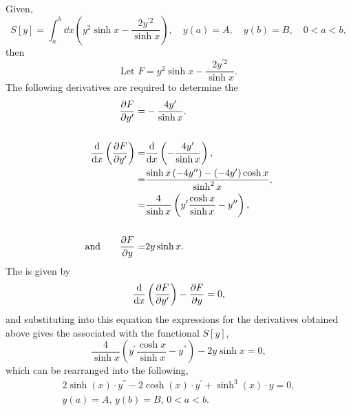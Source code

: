 Given,
\[
	S[y] = \int_a^b \dd x\left(y^2\sinh x -\frac{2y^{\prime 2}}{\sinh x}\right),\quad y(a) = A,\quad y(b) = B,\quad 0< a < b,
\]
then
\[
	\textrm{Let } F = y^2\sinh x -\frac{2y^{\prime 2}}{\sinh x}.
\]
The following derivatives are required to determine the \el{}
\begin{equation*}
\begin{split}
	\frac{\partial F}{\partial y^\prime} =& -\frac{4y^\prime}{\sinh x}.\\\\
	\frac{\mathrm{d}}{\mathrm{d}x}\left(\frac{\partial F}{\partial y^\prime}\right) =& \frac{\mathrm{d}}{\mathrm{d}x}\left( -\frac{4y^\prime}{\sinh x}\right),\\
	=& \frac{\sinh x\left(-4y^{\prime\prime}\right)-\left(-4y^\prime\right)\cosh x }{\sinh^2x},\\
	=& \frac{4}{\sinh x}\left(y^\prime\frac{\cosh x}{\sinh x}-y^{\prime\prime}\right),\\\\
	\textrm{and}\quad\quad{} \frac{\partial F}{\partial y}=& 2y\sinh x.
\end{split}
\end{equation*}
The \el is given by
\[
	\frac{\mathrm{d}}{\mathrm{d}x}\left(\frac{\partial F}{\partial y^\prime}\right)-\frac{\partial F}{\partial y} = 0,
\]
and substituting into this equation the expressions for the derivatives obtained above gives the \el associated with the functional $S[y]$,
\[
	\frac{4}{\sinh x}\left(y^\prime\frac{\cosh x}{\sinh x}-y^\dprime\right) - 2y\sinh x = 0,
\]
which can be rearranged into the following,
\begin{gather}
	2\sinh(x)\cdot y^\dprime - 2\cosh(x)\cdot y^\prime + \sinh^3(x)\cdot y = 0, \\ 
	y(a) = A,\, y(b) = B,\, 0< a < b.\nonumber
\end{gather}